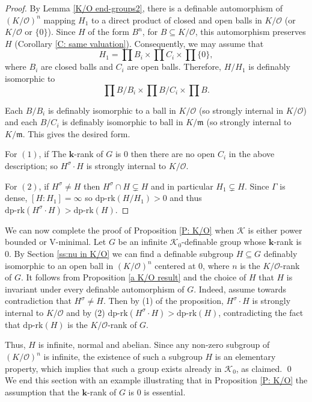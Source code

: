 \documentclass[11pt]{amsart}
\theoremstyle{definition}
\newcommand{\bk}{\textbf{k}}
\newcommand{\CK}{{\mathcal K}}
\newcommand{\CO}{{\mathcal O}}
\newcommand{\0}{\emptyset}
\def\bm{\mathfrak m}
\def\dpr{\mathrm{dp\text{-}rk}}
\def\sub{\subseteq}
\begin{document}
\begin{proof}
By Lemma \ref{K/O end-groups2}, there is a definable automorphism of $(K/\CO)^n$ mapping $H_1$ to a direct product of closed and open balls in $K/\CO$ (or $K/\CO$ or $\{0\}$). Since $H$ of the form $B^n$, for $B\sub K/\CO$, this automorphism preserves $H$ (Corollary \ref{C: same valuation}). Consequently, we may assume that 
\[
H_1=\prod B_i \times \prod C_i \times \prod \{0\},
\]
where $B_i$ are closed balls and $C_i$ are open balls. Therefore,    $H/H_1$ is definably isomorphic to
\[\prod B/B_i\times \prod B/C_i\times \prod B. \]

Each  $B/B_i$ is definably isomorphic to a ball in $K/\CO$ (so strongly internal in $K/\CO$) and 
each $B/C_i$ is definably isomorphic to  ball in $K/\bm$ (so strongly internal to $K/\bm$. This gives the desired form.


For $(1)$, if The $\bk$-rank of $G$ is $0$ then there are no open $C_i$ in the above description; so $H^\sigma\cdot H$ is strongly internal to $K/\CO$. 

For $(2)$, if $H^\sigma\neq H$ then $H^\sigma \cap H\subsetneq H$ and in particular $H_1\subsetneq H$. Since $\Gamma$ is dense, $[H:H_1]=\infty$ so  $\dpr(H/H_1)>0$ and thus $\dpr(H^\sigma\cdot H)>\dpr (H)$.
\end{proof}


We can now complete the proof of Proposition \ref{P: K/O} when $\CK$ is either power bounded or V-minimal.  Let $G$ be an infinite $\CK_0$-definable group whose $\bk$-rank is $0$. By Section \ref{ss:nu in K/O} we can find a definable subgroup $H\sub G$ definably isomorphic to an open ball in $(K/\CO)^n$ centered at $0$, where $n$ is the $K/\CO$-rank of $G$.  It follows from Proposition \ref{a K/O result} and the choice of $H$ that $H$ is invariant under every definable automorphism of $G$.
Indeed, assume towards contradiction that $H^\sigma\neq H$. Then by (1) of the proposition, $H^\sigma\cdot H$ is strongly internal to $K/\CO$ and by (2) $\dpr(H^\sigma\cdot H)>\dpr(H)$, contradicting the fact that $\dpr(H)$ is the $K/\CO$-rank of $G$.

Thus, $H$  is infinite, normal and abelian. Since any non-zero subgroup of $(K/\CO)^n$ is infinite, the existence of such a subgroup $H$ is an elementary property, which implies that such a group exists already in $\CK_0$, as claimed. \qed \\


We end this section with an example illustrating that in Proposition \ref{P: K/O} the assumption that the $\bk$-rank of $G$ is $0$ is essential.
\end{document}
